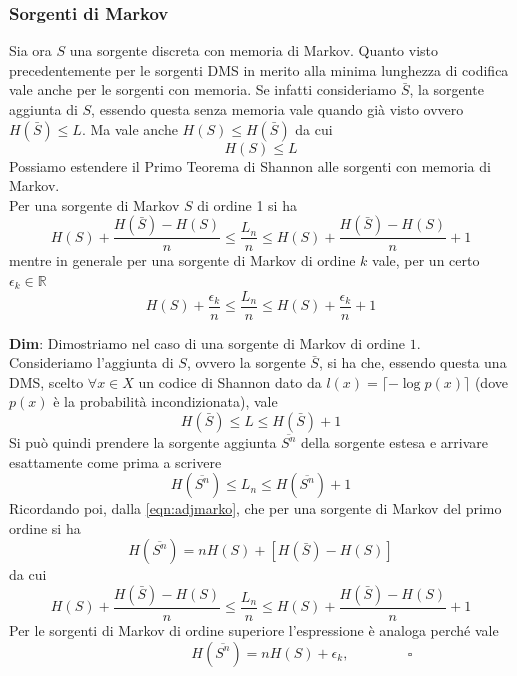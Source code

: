 \subsubsection{Sorgenti di Markov}
Sia ora $S$ una sorgente discreta con memoria di Markov. Quanto visto precedentemente per le sorgenti DMS in merito alla minima lunghezza di codifica vale anche per le sorgenti con memoria. Se infatti consideriamo $\bar{S}$, la sorgente aggiunta di $S$, essendo questa senza memoria vale quando già visto ovvero $H(\bar{S}) \leq L$. Ma vale anche $H(S) \leq H(\bar{S})$ da cui
\begin{equation}
    H(S) \leq L
\end{equation}
Possiamo estendere il Primo Teorema di Shannon alle sorgenti con memoria di Markov. \\
Per una sorgente di Markov $S$ di ordine 1 si ha
\begin{equation}
    H(S) + \frac{H(\bar{S}) - H(S)}{n} \leq \frac{L_n}{n} \leq H(S) + \frac{H(\bar{S}) - H(S)}{n} + 1
\end{equation}
mentre in generale per una sorgente di Markov di ordine $k$ vale, per un certo $\epsilon_k \in \mathbb{R}$
\begin{equation}
    H(S) + \frac{\epsilon_k}{n} \leq \frac{L_n}{n} \leq H(S) + \frac{\epsilon_k}{n} + 1
\end{equation}
\begin{tcolorbox}
\textbf{Dim}: Dimostriamo nel caso di una sorgente di Markov di ordine $1$. \\
Consideriamo l'aggiunta di $S$, ovvero la sorgente $\bar{S}$, si ha che, essendo questa una DMS, scelto $\forall x \in X$ un codice di Shannon dato da $l(x) = \lceil - \log p(x) \rceil$ (dove $p(x)$ \`e la probabilit\`a incondizionata), vale
\begin{equation*}
    H(\bar{S}) \leq L \leq H(\bar{S}) + 1
\end{equation*}
Si può quindi prendere la sorgente aggiunta $\overline{S^n}$ della sorgente estesa e arrivare esattamente come prima a scrivere
\begin{equation*}
    H(\overline{S^n}) \leq L_n \leq H(\overline{S^n}) + 1
\end{equation*}
Ricordando poi, dalla \ref{eqn:adjmarko}, che per una sorgente di Markov del primo ordine si ha
\begin{equation*}
    H(\overline{S^n}) = nH(S) + [H(\bar{S}) - H(S)]
\end{equation*}
da cui
\begin{equation*}
    H(S) + \frac{H(\bar{S}) - H(S)}{n} \leq \frac{L_n}{n} \leq H(S) + \frac{H(\bar{S}) - H(S)}{n} + 1
\end{equation*}
Per le sorgenti di Markov di ordine superiore l’espressione è analoga perché vale
\begin{equation*}
  \hspace{70pt}  H(\overline{S^n}) = nH(S) + \epsilon_k, \hspace{50pt} \square
\end{equation*}
\end{tcolorbox}